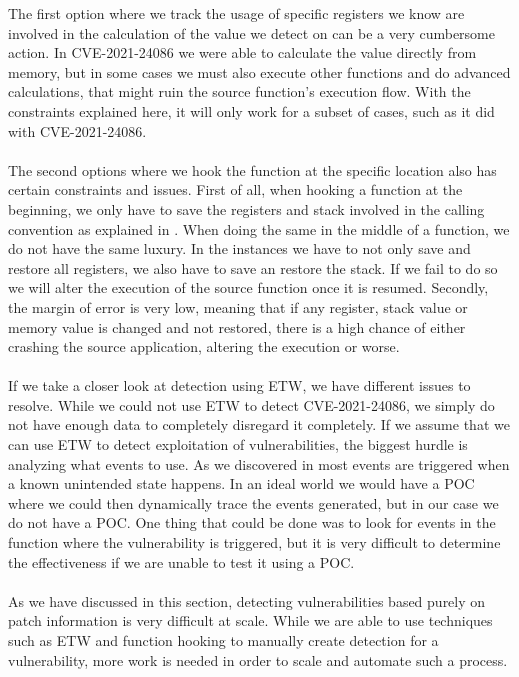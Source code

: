 \documentclass{report}
\begin{document}
The first option where we track the usage of specific registers we know are involved in the calculation of the value we detect on can be a very cumbersome action. In CVE-2021-24086 we were able to calculate the value directly from memory, but in some cases we must also execute other functions and do advanced calculations, that might ruin the source function's execution flow. With the constraints explained here, it will only work for a subset of cases, such as it did with CVE-2021-24086.
\\
\\
The second options where we hook the function at the specific location also has certain constraints and issues. First of all, when hooking a function at the beginning, we only have to save the registers and stack involved in the calling convention as explained in . When doing the same in the middle of a function, we do not have the same luxury. In the instances we have to not only save and restore all registers, we also have to save an restore the stack. If we fail to do so we will alter the execution of the source function once it is resumed. Secondly, the margin of error is very low, meaning that if any register, stack value or memory value is changed and not restored, there is a high chance of either crashing the source application, altering the execution or worse.
\\
\\
If we take a closer look at detection using \gls{ETW}, we have different issues to resolve. While we could not use \gls{ETW} to detect CVE-2021-24086, we simply do not have enough data to completely disregard it completely. If we assume that we can use \gls{ETW} to detect exploitation of vulnerabilities, the biggest hurdle is analyzing what events to use. As we discovered in  most events are triggered when a known unintended state happens. In an ideal world we would have a \gls{POC} where we could then dynamically trace the events generated, but in our case we do not have a \gls{POC}. One thing that could be done was to look for events in the function where the vulnerability is triggered, but it is very difficult to determine the effectiveness if we are unable to test it using a \gls{POC}.
\\
\\
As we have discussed in this section, detecting vulnerabilities based purely on patch information is very difficult at scale. While we are able to use techniques such as \gls{ETW} and function hooking to manually create detection for a vulnerability, more work is needed in order to scale and automate such a process.
\end{document}
